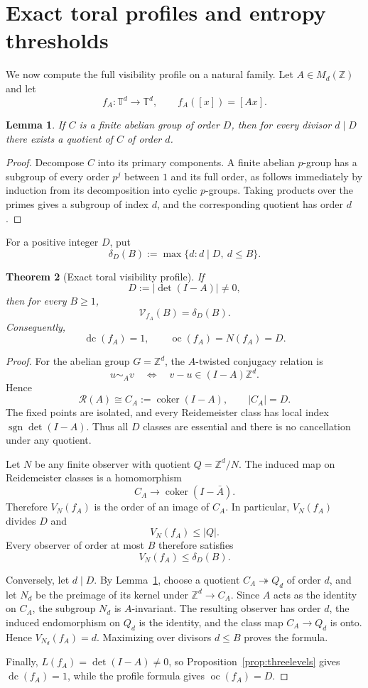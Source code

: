 \documentclass[11pt]{article}
\newtheorem{theorem}{Theorem}[section]
\newtheorem{lemma}[theorem]{Lemma}
\DeclareMathOperator{\coker}{coker}
\DeclareMathOperator{\oc}{oc}
\DeclareMathOperator{\dc}{dc}
\newcommand{\RN}{\mathcal R}
\newcommand{\VN}{\mathcal V}
\newcommand{\Z}{\mathbb Z}
\newcommand{\T}{\mathbb T}
\begin{document}
\section{Exact toral profiles and entropy thresholds}

We now compute the full visibility profile on a natural family.  Let
$A\in M_d(\Z)$ and let
\[
  f_A\colon\T^d\to\T^d,
  \qquad
  f_A([x])=[Ax].
\]

\begin{lemma}
\label{lem:abelianquotients}
If $C$ is a finite abelian group of order $D$, then for every divisor
$d\mid D$ there exists a quotient of $C$ of order $d$.
\end{lemma}

\begin{proof}
Decompose $C$ into its primary components.  A finite abelian $p$-group has a
subgroup of every order $p^j$ between $1$ and its full order, as follows
immediately by induction from its decomposition into cyclic $p$-groups.
Taking products over the primes gives a subgroup of index $d$, and the
corresponding quotient has order $d$.
\end{proof}

For a positive integer $D$, put
\[
  \delta_D(B):=\max\{d:d\mid D,\ d\le B\}.
\]

\begin{theorem}[Exact toral visibility profile]
\label{thm:toralprofile}
If
\[
  D:=|\det(I-A)|\ne0,
\]
then for every $B\ge1$,
\[
  \boxed{\VN_{f_A}(B)=\delta_D(B).}
\]
Consequently,
\[
  \dc(f_A)=1,
  \qquad
  \oc(f_A)=N(f_A)=D.
\]
\end{theorem}

\begin{proof}
For the abelian group $G=\Z^d$, the $A$-twisted conjugacy relation is
\[
  u\sim_A v
  \quad\Longleftrightarrow\quad
  v-u\in(I-A)\Z^d.
\]
Hence
\[
  \RN(A)\cong C_A:=\coker(I-A),
  \qquad |C_A|=D.
\]
The fixed points are isolated, and every Reidemeister class has local index
$\operatorname{sgn}\det(I-A)$.  Thus all $D$ classes are essential and there
is no cancellation under any quotient.

Let $N$ be any finite observer with quotient $Q=\Z^d/N$.  The induced map on
Reidemeister classes is a homomorphism
\[
  C_A\longrightarrow\coker(I-\bar A).
\]
Therefore $V_N(f_A)$ is the order of an image of $C_A$.  In particular,
$V_N(f_A)$ divides $D$ and
\[
  V_N(f_A)\le |Q|.
\]
Every observer of order at most $B$ therefore satisfies
\[
  V_N(f_A)\le\delta_D(B).
\]

Conversely, let $d\mid D$.  By Lemma~\ref{lem:abelianquotients}, choose a
quotient $C_A\twoheadrightarrow Q_d$ of order $d$, and let $N_d$ be the
preimage of its kernel under $\Z^d\to C_A$.  Since $A$ acts as the identity on
$C_A$, the subgroup $N_d$ is $A$-invariant.  The resulting observer has order
$d$, the induced endomorphism on $Q_d$ is the identity, and the class map
$C_A\to Q_d$ is onto.  Hence $V_{N_d}(f_A)=d$.  Maximizing over divisors
$d\le B$ proves the formula.

Finally, $L(f_A)=\det(I-A)\ne0$, so Proposition~\ref{prop:threelevels} gives
$\dc(f_A)=1$, while the profile formula gives $\oc(f_A)=D$.
\end{proof}
\end{document}

